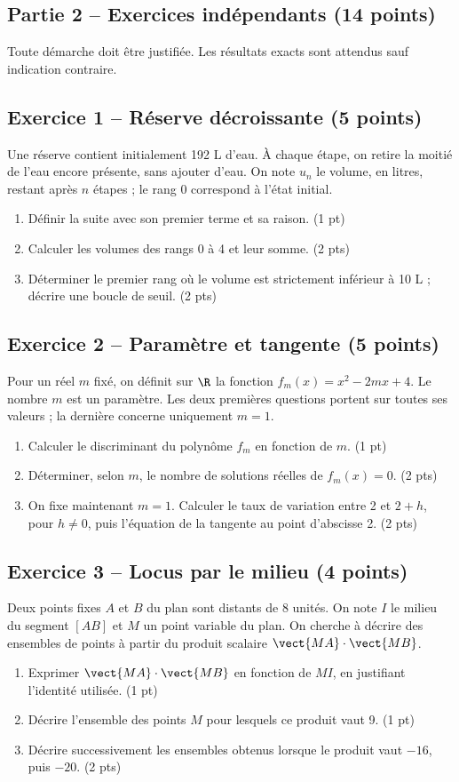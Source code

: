 \clearpage\subsection*{Partie 2 -- Exercices indépendants (14 points)}
Toute démarche doit être justifiée. Les résultats exacts sont attendus sauf indication contraire.
\subsection*{Exercice 1 -- Réserve décroissante (5 points)}
Une réserve contient initialement 192 L d’eau. À chaque étape, on retire la moitié de l’eau encore présente, sans ajouter d’eau. On note $u_n$ le volume, en litres, restant après $n$ étapes ; le rang 0 correspond à l’état initial.
\begin{enumerate}
\item Définir la suite avec son premier terme et sa raison. \hfill(1 pt)
\item Calculer les volumes des rangs 0 à 4 et leur somme. \hfill(2 pts)
\item Déterminer le premier rang où le volume est strictement inférieur à 10 L ; décrire une boucle de seuil. \hfill(2 pts)
\end{enumerate}
\subsection*{Exercice 2 -- Paramètre et tangente (5 points)}
Pour un réel $m$ fixé, on définit sur $\R$ la fonction $f_m(x)=x^2-2mx+4$. Le nombre $m$ est un paramètre. Les deux premières questions portent sur toutes ses valeurs ; la dernière concerne uniquement $m=1$.
\begin{enumerate}
\item Calculer le discriminant du polynôme $f_m$ en fonction de $m$. \hfill(1 pt)
\item Déterminer, selon $m$, le nombre de solutions réelles de $f_m(x)=0$. \hfill(2 pts)
\item On fixe maintenant $m=1$. Calculer le taux de variation entre 2 et $2+h$, pour $h\ne0$, puis l’équation de la tangente au point d’abscisse 2. \hfill(2 pts)
\end{enumerate}
\subsection*{Exercice 3 -- Locus par le milieu (4 points)}
Deux points fixes $A$ et $B$ du plan sont distants de 8 unités. On note $I$ le milieu du segment $[AB]$ et $M$ un point variable du plan. On cherche à décrire des ensembles de points à partir du produit scalaire $\vect{MA}\cdot\vect{MB}$.
\begin{enumerate}
\item Exprimer $\vect{MA}\cdot\vect{MB}$ en fonction de $MI$, en justifiant l’identité utilisée. \hfill(1 pt)
\item Décrire l’ensemble des points $M$ pour lesquels ce produit vaut 9. \hfill(1 pt)
\item Décrire successivement les ensembles obtenus lorsque le produit vaut $-16$, puis $-20$. \hfill(2 pts)
\end{enumerate}
